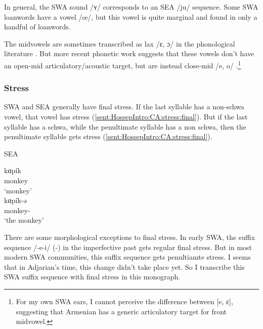 In general, the SWA sound /ʏ/ corresponds to an SEA /ju/ sequence. Some SWA loanwords have a vowel /œ/, but this vowel is quite marginal and found in only a handful of loanwords. 

The midvowels are sometimes transcribed as lax /ɛ, ɔ/ in the phonological literature \citep{Vaux-1998-ArmenianPhono}. But more recent phonetic work suggests that these vowels don't have an open-mid articulatory/acoustic target, but are instead close-mid /e, o/ \citep{Toparlak-2019-MAArmenianPhonetics,Seyfarth-JIPAArmenian}.\footnote{For my own SWA ears, I cannot perceive the difference between [e, ɛ], suggesting that Armenian has a generic articulatory target for front midvowel.}
	
\subsubsection{Stress}\label{sec:HossepIntro:phonotransc:modern:stress}




SWA and SEA generally have final stress. If the last syllable has a non-schwa vowel, that vowel has stress (\ref{sent:HossepIntro:CA:stress:final}). But if the last syllable has a schwa, while the penultimate syllable has a non schwa, then the penultimate syllable gets stress (\ref{sent:HossepIntro:CA:stress:final}). 

\begin{exe}
	\ex SEA \label{sent:HossepIntro:CA:stress}
	\begin{xlist}
		\ex \gll kɑp\'ik \\
		monkey \\
		\trans `monkey' \label{sent:HossepIntro:CA:stress:final}\\
		\ex \gll kɑp\'ik-ə \\
		monkey-{} \\
		\trans `the monkey' \label{sent:HossepIntro:CA:stress:penult} \\
		
	\end{xlist}
\end{exe}

There are some morphological exceptions to final stress. In early SWA, the suffix sequence /-e-i/ ({\thgloss}-{\pst}) in the imperfective past gets regular final stress. But in  most modern SWA communities, this suffix sequence gets penultiamte stress. I seems that in Adjarian's time, this change didn't take place yet. So I transcribe this SWA suffix sequence with final stress in this monograph. 

